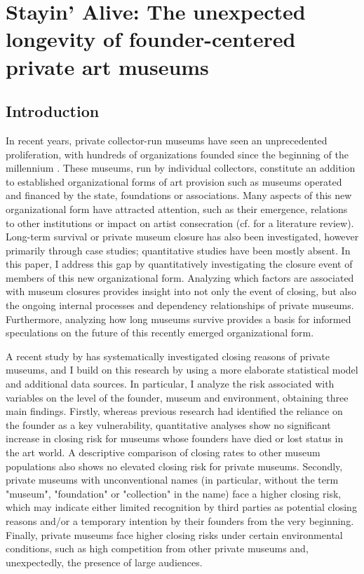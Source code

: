 \documentclass[12pt]{article}
\author{Johannes }
\date{\today}
\title{}
\begin{document}
\section*{Stayin' Alive: The unexpected longevity of founder-centered private art museums}

\subsection*{Introduction}


In recent years, private collector-run museums have seen an unprecedented proliferation, with hundreds of organizations founded since the beginning of the millennium \parencite{Velthuis_etal_2023_boom,LarrysList_2015_report}.
These museums, run by individual collectors, constitute an addition to established organizational forms of art provision such as museums operated and financed by the state, foundations or associations.
Many aspects of this new organizational form have attracted attention, such as their emergence, relations to other institutions or impact on artist consecration (cf. \textcite{Kolbe_etal_2022_privatemuseum} for a literature review).
Long-term survival or private museum closure has also been investigated, however primarily through case studies; quantitative studies have been mostly absent.
In this paper, I address this gap by quantitatively investigating the closure event of members of this new organizational form.
Analyzing which factors are associated with museum closures provides insight into not only the event of closing, but also the ongoing internal processes and dependency relationships of private museums.
Furthermore, analyzing how long museums survive provides a basis for informed speculations on the future of this recently emerged organizational form. 


A recent study by \textcite{Velthuis_Gera_2024_fragility} has systematically investigated closing reasons of private museums, and I build on this research by using a more elaborate statistical model and additional data sources.
In particular, I analyze the risk associated with variables on the level of the founder, museum and environment, obtaining three main findings. 
Firstly, whereas previous research had identified the reliance on the founder as a key vulnerability, quantitative analyses show no significant increase in closing risk for museums whose founders have died or lost status in the art world.
A descriptive comparison of closing rates to other museum populations also shows no elevated closing risk for private museums.
Secondly, private museums with unconventional names (in particular, without the term "museum", "foundation" or "collection" in the name) face a higher closing risk, which may indicate either limited recognition by third parties as potential closing reasons and/or a temporary intention by their founders from the very beginning.
Finally, private museums face higher closing risks under certain environmental conditions, such as high competition from other private museums and, unexpectedly, the presence of large audiences.
\end{document}
